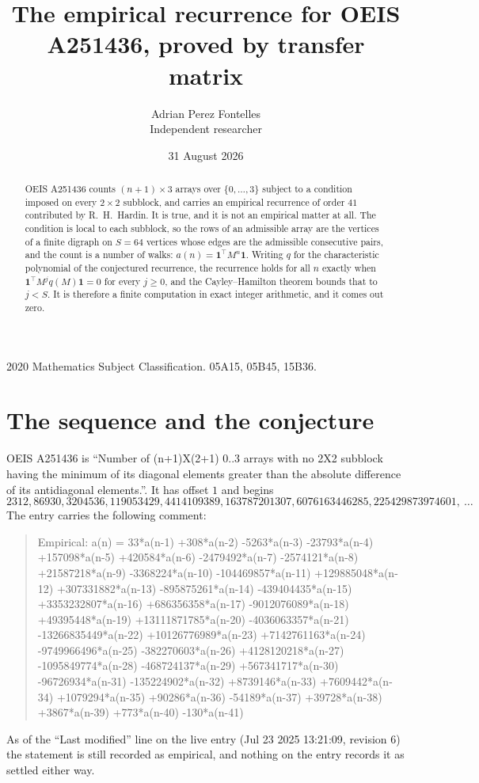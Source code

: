 \documentclass[11pt,a4paper]{article}
\title{The empirical recurrence for OEIS A251436, proved by transfer matrix}
\author{Adrian Perez Fontelles\\ \small Independent researcher}
\date{31 August 2026}
\theoremstyle{plain}
\theoremstyle{definition}
\begin{document}
\maketitle

\begin{abstract}
OEIS A251436 counts $(n+1)\times3$ arrays over $\{0,\dots,3\}$ subject to a condition imposed on
every $2\times2$ subblock, and carries an empirical recurrence of order $41$ contributed
by R.~H.~Hardin. It is true, and it is not an empirical matter at all. The condition is local
to each subblock, so the rows of an admissible array are the vertices of a finite digraph
on $S=64$ vertices whose edges are the admissible consecutive pairs, and the count is a
number of walks: $a(n)=\mathbf{1}^{\!\top}M^{n}\mathbf{1}$. Writing $q$
for the characteristic polynomial of the conjectured recurrence, the recurrence holds for all
$n$ exactly when $\mathbf{1}^{\!\top}M^{j}q(M)\mathbf{1}=0$ for every $j\ge0$, and the
Cayley--Hamilton theorem bounds that to $j<S$. It is therefore a finite computation in exact
integer arithmetic, and it comes out zero.
\end{abstract}

\noindent\small 2020 Mathematics Subject Classification. 05A15, 05B45, 15B36.\normalsize

\section{The sequence and the conjecture}

OEIS A251436 is ``Number of (n+1)X(2+1) 0..3 arrays with no 2X2 subblock having the minimum of its diagonal elements greater than the absolute difference of its antidiagonal elements.''. It has offset $1$ and begins
\[
2312, 86930, 3204536, 119053429, 4414109389, 163787201307, 6076163446285, 225429873974601,\ \dots
\]
The entry carries the following comment:
\begin{quote}\small
Empirical: a(n) = 33*a(n-1) +308*a(n-2) -5263*a(n-3) -23793*a(n-4) +157098*a(n-5) +420584*a(n-6) -2479492*a(n-7) -2574121*a(n-8) +21587218*a(n-9) -3368224*a(n-10) -104469857*a(n-11) +129885048*a(n-12) +307331882*a(n-13) -895875261*a(n-14) -439404435*a(n-15) +3353232807*a(n-16) +686356358*a(n-17) -9012076089*a(n-18) +49395448*a(n-19) +13111871785*a(n-20) -4036063357*a(n-21) -13266835449*a(n-22) +10126776989*a(n-23) +7142761163*a(n-24) -9749966496*a(n-25) -382270603*a(n-26) +4128120218*a(n-27) -1095849774*a(n-28) -468724137*a(n-29) +567341717*a(n-30) -96726934*a(n-31) -135224902*a(n-32) +8739146*a(n-33) +7609442*a(n-34) +1079294*a(n-35) +90286*a(n-36) -54189*a(n-37) +39728*a(n-38) +3867*a(n-39) +773*a(n-40) -130*a(n-41)
\end{quote}
As of the ``Last modified'' line on the live entry (Jul 23 2025 13:21:09, revision 6) the statement is
still recorded as empirical, and nothing on the entry records it as settled either way.
\end{document}
